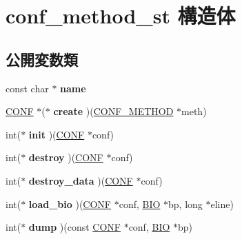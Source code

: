 \hypertarget{structconf__method__st}{}\section{conf\+\_\+method\+\_\+st 構造体}
\label{structconf__method__st}
\subsection*{公開変数類}
\begin{DoxyCompactItemize}
\item 
\hypertarget{structconf__method__st_a3349eb0f994901012106e16ffbba7a19}{}const char $\ast$ {\bfseries name}\label{structconf__method__st_a3349eb0f994901012106e16ffbba7a19}

\item 
\hypertarget{structconf__method__st_a11f5d812406f403c32ae2b99bb5aae5e}{}\hyperlink{structconf__st}{C\+O\+N\+F} $\ast$($\ast$ {\bfseries create} )(\hyperlink{structconf__method__st}{C\+O\+N\+F\+\_\+\+M\+E\+T\+H\+O\+D} $\ast$meth)\label{structconf__method__st_a11f5d812406f403c32ae2b99bb5aae5e}

\item 
\hypertarget{structconf__method__st_af4c92d4cdeff7ceecd0b523201722c1c}{}int($\ast$ {\bfseries init} )(\hyperlink{structconf__st}{C\+O\+N\+F} $\ast$conf)\label{structconf__method__st_af4c92d4cdeff7ceecd0b523201722c1c}

\item 
\hypertarget{structconf__method__st_a9b4f45995dd4fd551e4586aa41ed370e}{}int($\ast$ {\bfseries destroy} )(\hyperlink{structconf__st}{C\+O\+N\+F} $\ast$conf)\label{structconf__method__st_a9b4f45995dd4fd551e4586aa41ed370e}

\item 
\hypertarget{structconf__method__st_ac68ecdd9bc4dd2cbca6379ae13fd6335}{}int($\ast$ {\bfseries destroy\+\_\+data} )(\hyperlink{structconf__st}{C\+O\+N\+F} $\ast$conf)\label{structconf__method__st_ac68ecdd9bc4dd2cbca6379ae13fd6335}

\item 
\hypertarget{structconf__method__st_a2a0369109a541d85263dc5ce24060a1a}{}int($\ast$ {\bfseries load\+\_\+bio} )(\hyperlink{structconf__st}{C\+O\+N\+F} $\ast$conf, \hyperlink{structbio__st}{B\+I\+O} $\ast$bp, long $\ast$eline)\label{structconf__method__st_a2a0369109a541d85263dc5ce24060a1a}

\item 
\hypertarget{structconf__method__st_a20d82ae26d815bfc82ac54720d867cb9}{}int($\ast$ {\bfseries dump} )(const \hyperlink{structconf__st}{C\+O\+N\+F} $\ast$conf, \hyperlink{structbio__st}{B\+I\+O} $\ast$bp)\label{structconf__method__st_a20d82ae26d815bfc82ac54720d867cb9}


\end{DoxyCompactItemize}
